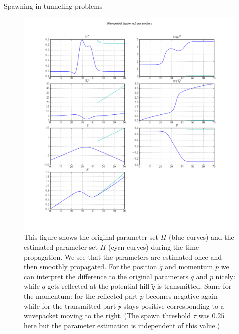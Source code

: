 \begin{chapter}{Spawning in tunneling problems}
\begin{figure}
  \centering
  \includegraphics[width=\the\linewidth]{./figures/spawn_propag_K100_spawn_threshold025/wavepacket_parameters_abs_ang_spawned.png}
  \caption[Original and estimated parameter set for spawning propagation]{This
  figure shows the original parameter set $\Pi$ (blue curves) and the estimated parameter
  set $\tilde{\Pi}$ (cyan curves) during the time propagation. We see that the parameters
  are estimated once and then smoothly propagated. For the position $\tilde{q}$ and
  momentum $\tilde{p}$ we can interpret the difference to the original parameters
  $q$ and $p$ nicely: while $q$ gets reflected at the potential hill $\tilde{q}$ is
  transmitted. Same for the momentum: for the reflected part $p$ becomes negative
  again while for the transmitted part $\tilde{p}$ stays positive corresponding
  to a wavepacket moving to the right. (The spawn threshold $\tau$ was $0.25$ here
  but the parameter estimation is independent of this value.)}
\end{figure}



\end{chapter}
